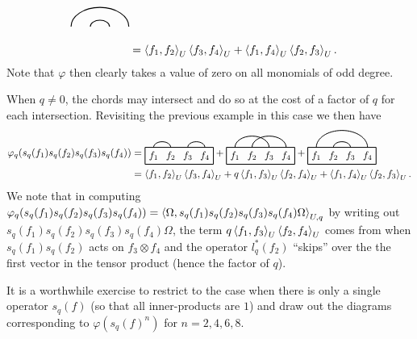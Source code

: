 \begin{rem}
\begin{align*}
\begin{tikzpicture}[baseline]
			\draw[thick] (2.1,0.3) arc (0:180:0.9 and 0.6);
			\draw[thick] (1.5,0.3) arc (0:180:0.3 and 0.2);
			\end{tikzpicture}\\
		&=\<f_1,f_2\>_U\<f_3,f_4\>_U + \<f_1, f_4\>_U\<f_2,f_3\>_U.
	\end{align*}
Note that $\varphi$ then clearly takes a value of zero on all monomials of odd degree.\par
When $q\neq 0$, the chords may intersect and do so at the cost of a factor of $q$ for each intersection. Revisiting the previous example in this case we then have
	\begin{align*}
		\varphi_q(s_q(f_1)s_q(f_2)s_q(f_3)s_q(f_4)) &= 
			\begin{tikzpicture}[baseline]
			\draw [thick] (0,0.3) -- (0,-0.3) -- (2.4,-0.3) -- (2.4,0.3) -- (0,0.3);
			\node at (.3,0) {$f_1$};
			\node at (.9,0) {$f_2$};
			\node at (1.5,0) {$f_3$};
			\node at (2.1,0) {$f_4$};
			\draw[thick] (0.9,0.3) arc (0:180:0.3 and 0.2);
			\draw[thick] (2.1,0.3) arc (0:180:0.3 and 0.2);
			\end{tikzpicture}
		+
			\begin{tikzpicture}[baseline]
			\draw [thick] (0,0.3) -- (0,-0.3) -- (2.4,-0.3) -- (2.4,0.3) -- (0,0.3);
			\node at (.3,0) {$f_1$};
			\node at (.9,0) {$f_2$};
			\node at (1.5,0) {$f_3$};
			\node at (2.1,0) {$f_4$};
			\draw[thick] (1.5,0.3) arc (0:180:0.6 and 0.4);
			\draw[thick] (2.1,0.3) arc (0:180:0.6 and 0.4);
			\end{tikzpicture}
		+
			\begin{tikzpicture}[baseline]
			\draw [thick] (0,0.3) -- (0,-0.3) -- (2.4,-0.3) -- (2.4,0.3) -- (0,0.3);
			\node at (.3,0) {$f_1$};
			\node at (.9,0) {$f_2$};
			\node at (1.5,0) {$f_3$};
			\node at (2.1,0) {$f_4$};
			\draw[thick] (2.1,0.3) arc (0:180:0.9 and 0.6);
			\draw[thick] (1.5,0.3) arc (0:180:0.3 and 0.2);
			\end{tikzpicture}\\
		&=\<f_1,f_2\>_U\<f_3,f_4\>_U + q\<f_1,f_3\>_U\<f_2,f_4\>_U + \<f_1, f_4\>_U\<f_2,f_3\>_U.
	\end{align*}
We note that in computing $\varphi_q(s_q(f_1)s_q(f_2)s_q(f_3)s_q(f_4))=\left\langle\Omega, s_q(f_1)s_q(f_2)s_q(f_3)s_q(f_4)\Omega\right\rangle_{U,q}$ by writing out $s_q(f_1)s_q(f_2)s_q(f_3)s_q(f_4)\Omega$, the term $ q\left\langle f_1,f_3\right\rangle_U\left\langle f_2,f_4\right\rangle_U$ comes from when $s_q(f_1)s_q(f_2)$ acts on $f_3\otimes f_4$ and the operator $l_q^*(f_2)$ ``skips'' over the the first vector in the tensor product (hence the factor of $q$).\par
It is a worthwhile exercise to restrict to the case when there is only a single operator $s_q(f)$ (so that all inner-products are $1$) and draw out the diagrams corresponding to $\varphi(s_q(f)^n)$ for $n=2,4,6,8$.
\end{rem}

